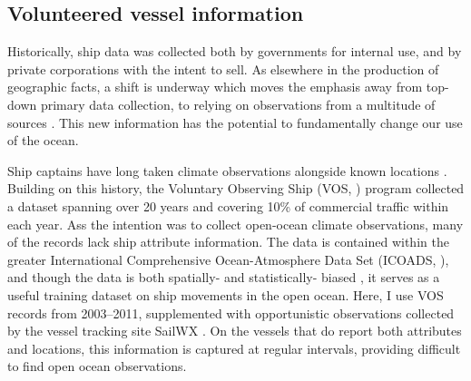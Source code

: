 \documentclass[12pt,letterpaper]{article}
\begin{document}


\subsection{Volunteered vessel information}


Historically, ship data was collected both by governments for internal use, and by private corporations with the intent to sell. As elsewhere in the production of geographic facts, a shift is underway which moves the emphasis away from top-down primary data collection, to relying on observations from a multitude of sources \citep{goodchild2007citizens,elwood2011researching}. This new information has the potential to fundamentally change our use of the ocean.

Ship captains have long taken climate observations alongside known locations \citep{brohan2009marine}.  Building on this history, the Voluntary Observing Ship (VOS, \citealp{VOSOverview}) program collected a dataset spanning over 20 years and covering 10\% of commercial traffic within each year. Ass the intention was to collect open-ocean climate observations, many of the records lack ship attribute information. %
The data is contained within the greater International Comprehensive Ocean-Atmosphere Data Set (ICOADS, \citealp{woodruff2010icoads}), and though the data is both spatially- and statistically- biased \citep{Wang2007}, it serves as a useful training dataset on ship movements in the open ocean. Here, I use VOS records from 2003--2011, supplemented with opportunistic observations collected by the vessel tracking site SailWX \citep{SAILWX}. On the vessels that do report both attributes and locations, this information is captured at regular intervals, providing difficult to find open ocean observations.
\end{document}
